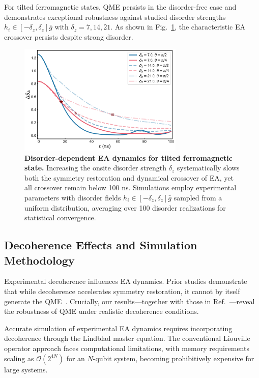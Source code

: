 \documentclass[reprint,superscriptaddress,preprintnumbers,longbibliography,
amsmath,amssymb,aps,floatfix,pra,twocolumn, tightenlines %
]{revtex4-2}
\begin{document}
    For tilted ferromagnetic states, QME persists in the disorder-free case and demonstrates exceptional robustness against studied disorder strengths $ h_i \in [-\delta_z,\delta_z]\bar{g}$ with $\delta_z = 7,14,21$. As shown in Fig.~\ref{Disorder_ferr}, the characteristic EA crossover persists despite strong disorder.

    
    \begin{figure}[h]
    \centering
    \includegraphics[width=0.7\textwidth]{suppFig/SuppFig6_EA_disorder.pdf}
    \caption{ \textbf{Disorder-dependent EA dynamics for tilted ferromagnetic state.} 
        Increasing the onsite disorder strength $\delta_z $ systematically slows both the symmetry restoration and dynamical crossover of EA, yet all crossover remain below 100 ns. Simulations employ experimental parameters with disorder fields $h_i \in [-\delta_z,\delta_z]\bar{g}$ sampled from a uniform distribution, averaging over 100 disorder realizations for statistical convergence.
    }
    \label{Disorder_ferr}
    \end{figure}
	 
	 \subsection{Decoherence Effects and Simulation Methodology}
	 
	Experimental decoherence influences EA dynamics. Prior studies demonstrate that while decoherence accelerates symmetry restoration, it cannot by itself generate the QME~\cite{QME_trapped_ion}. Crucially, our results—together with those in Ref.~\cite{QME_trapped_ion}—reveal the robustness of QME under realistic decoherence conditions.
	 
    Accurate simulation of experimental EA dynamics requires incorporating decoherence through the Lindblad master equation. The conventional Liouville operator approach faces computational limitations, with memory requirements scaling as $\mathcal{O}(2^{4N})$ for an $N$-qubit system, becoming prohibitively expensive for large systems.
    
\end{document}
